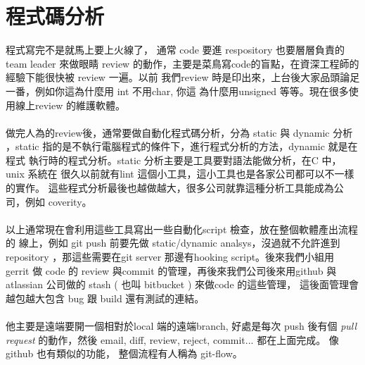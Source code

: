 \chapter{程式碼分析}
程式寫完不是就馬上要上火線了，
通常 code 要進 respository 也要層層負責的 team leader 來做眼睛 review
的動作，主要是菜鳥寫code的盲點，在資深工程師的經驗下能很快被 review 一遍。以前
我們review 時是印出來，上台後大家品頭論足一番，例如你這為什麼用 int 不用char, 你這
為什麼用unsigned 等等。現在很多使用線上review 的維護軟體。
\\\\
做完人為的review後，通常要做自動化程式碼分析，分為 static 與 dynamic 分析
，static 指的是不執行電腦程式的條件下，進行程式分析的方法，dynamic 就是在程式
執行時的程式分析。static 分析主要是工具要對語法能做分析，在C 中，unix 系統在
很久以前就有lint 這個小工具，這小工具也是各家公司都可以不一樣的實作。
這些程式分析最後也越做越大，很多公司就靠這種分析工具能成為公司，例如 coverity。
\\\\
以上通常現在會利用這些工具寫出一些自動化script 檢查，放在整個軟體產出流程的
線上，例如 git push 前要先做 static/dynamic analsys，沒過就不允許進到 repository
，那這些需要在git server 那邊有hooking script。後來我們小組用 gerrit 做 code 的
review 與commit 的管理，再後來我們公司後來用github 與 atlassian 公司做的 stash
( 也叫 bitbucket ) 來做code 的這些管理， 這後面管理會越包越大包含 bug 跟 build
還有測試的連結。
\\\\
他主要是遠端要開一個相對於local 端的遠端branch, 好處是每次 push 後有個 
\emph{pull request} 的動作，然後 email, diff, review, reject, commit...
都在上面完成。 像 github 也有類似的功能， 整個流程有人稱為 git-flow。

